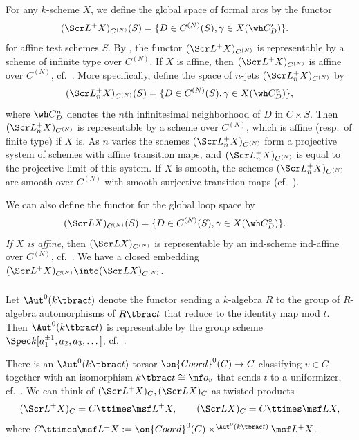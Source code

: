 For any $k$-scheme $X$, we define the global space of formal arcs
by the functor
\begin{align*}
(\Scr L^+ X)_{C^{(N)}}(S) & = \{ D \in C^{(N)}(S), \gamma \in X(\wh C'_D) \}.
\end{align*}
for affine test schemes $S$.
By \cite[Proposition 2.4.1]{KV}, the functor $(\Scr L^+ X)_{C^{(N)}}$ is representable by a scheme of infinite type over $C^{(N)}$.
If $X$ is affine, then $(\Scr L^+ X)_{C^{(N)}}$ is affine
over $C^{(N)}$, cf.~\cite[2.4.3]{KV}.
More specifically,
define the space of $n$-jets $(\Scr L^+_n X)_{C^{(N)}}$ by
\[ (\Scr L^+_n X)_{C^{(N)}}(S) = \{ D\in C^{(N)}(S), \gamma \in X(\wh C^n_D) \}, \]
where $\wh C^n_D$ denotes the $n$th infinitesimal neighborhood of $D$
in $C\times S$. Then $(\Scr L^+_n X)_{C^{(N)}}$ is representable
by a scheme over $C^{(N)}$, which is affine (resp.~of finite type) if $X$ is.  As $n$ varies
the schemes $(\Scr L^+_n X)_{C^{(N)}}$ form a projective system of schemes
with affine transition maps, and
$(\Scr L^+_n X)_{C^{(N)}}$ is equal to the projective limit of this system.
If $X$ is smooth, the schemes $(\Scr L^+_n X)_{C^{(N)}}$ are
smooth over $C^{(N)}$ with smooth surjective transition maps (cf.~\cite[Lemma 2.5.1]{cpsii}).


We can also define the functor for the global loop space by
\begin{align*}
(\Scr L X)_{C^{(N)}}(S) & = \{ D \in C^{(N)}(S), \gamma \in X(\wh C^\circ_D) \}.
\end{align*}
\emph{If $X$ is affine}, then $(\Scr L X)_{C^{(N)}}$
is representable by an ind-scheme ind-affine over $C^{(N)}$,
cf.~\cite[Proposition 2.5.2]{KV}.
We have a closed embedding $(\Scr L^+ X)_{C^{(N)}} \into (\Scr L X)_{C^{(N)}}$.

\subsubsection{}\label{sect:Llocalization}
Let $\Aut^0(k\tbrac t)$ denote the functor sending a $k$-algebra $R$
to the group of $R$-algebra automorphisms of $R\tbrac t$ that reduce to
the identity map mod $t$. Then $\Aut^0(k\tbrac t)$ is representable
by the group scheme $\Spec k[a_1^{\pm 1}, a_2, a_3, \dotsc]$, cf.~\cite[(1.3.13)]{Xinwen}.



There is an $\Aut^0(k\tbrac t)$-torsor $\on{Coord}^0(C) \to C$
classifying $v \in C$ together with an isomorphism $k\tbrac t \cong \mf o_v$
that sends $t$ to a uniformizer, cf.~\cite[(3.1.10)]{Xinwen}.
We can think of $(\Scr L^+ X)_C, (\Scr L X)_C$ as twisted products
\[
    (\Scr L^+ X)_C = C \ttimes \msf L^+ X, \qquad (\Scr L X)_C = C\ttimes \msf L X,
\]
where $C \ttimes \msf L^+ X := \on{Coord}^0(C) \times^{\Aut^0(k\tbrac t)} \msf L^+ X$.


